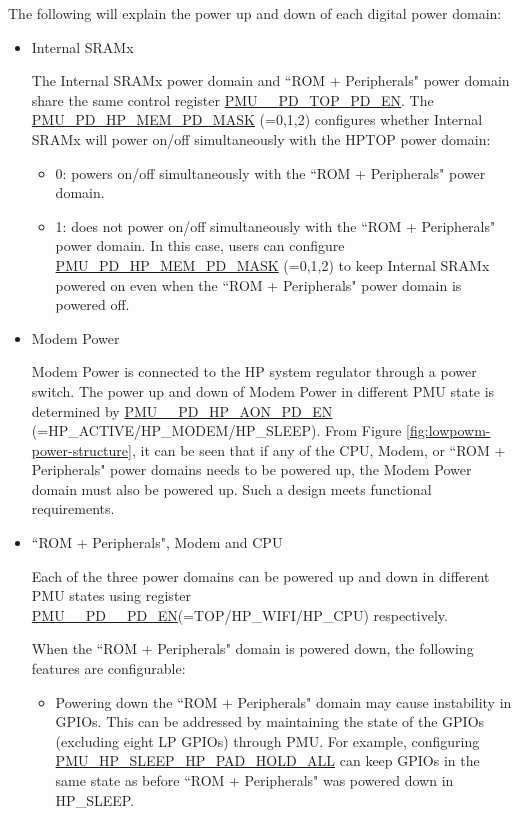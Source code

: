 \documentclass[main\_\_EN.tex]{subfiles}
\begin{document}
The following will explain the power up and down of each digital power domain:

\begin{itemize}
    \item Internal SRAMx

    The Internal SRAMx power domain and ``ROM + Peripherals" power domain share the same control register \hyperref[fielddesc:PMUHPACTIVEPDTOPPDEN]{PMU\_\_PD\_TOP\_PD\_EN}. The \hyperref[fielddesc:PMUPDHPMEM0PDMASK]{PMU\_PD\_HP\_MEM\_PD\_MASK} (=0,1,2) configures whether Internal SRAMx will power on/off simultaneously with the HPTOP power domain:

    \begin{itemize}
        \item 0: powers on/off simultaneously with the ``ROM + Peripherals" power domain.
        \item 1: does not power on/off simultaneously with the ``ROM + Peripherals" power domain. In this case, users can configure \hyperref[fielddesc:PMUPDHPMEM0PDMASK]{PMU\_PD\_HP\_MEM\_PD\_MASK} (=0,1,2) to keep Internal SRAMx powered on even when the ``ROM + Peripherals" power domain is powered off.
    \end{itemize}

    \item Modem Power

    Modem Power is connected to the HP system regulator through a power switch. The power up and down of Modem Power in different PMU state is determined by \hyperref[fielddesc:PMUHPACTIVEPDHPAONPDEN]{PMU\_\_PD\_HP\_AON\_PD\_EN} (=HP\_ACTIVE/HP\_MODEM/HP\_SLEEP). From Figure \ref{fig:lowpowm-power-structure}, it can be seen that if any of the CPU, Modem, or ``ROM + Peripherals" power domains needs to be powered up, the Modem Power domain must also be powered up. Such a design meets functional requirements.

    \item ``ROM + Peripherals", Modem and CPU

    Each of the three power domains can be powered up and down in different PMU states using register \hyperref[fielddesc:PMUHPACTIVEPDHPCPUPDEN]{PMU\_\_PD\_\_PD\_EN}(=TOP/HP\_WIFI/HP\_CPU) respectively.

    When the ``ROM + Peripherals" domain is powered down, the following features are configurable:
        \begin{itemize}
        \item Powering down the ``ROM + Peripherals" domain may cause instability in GPIOs. This can be addressed by maintaining the state of the GPIOs (excluding eight LP GPIOs) through PMU. For example, configuring \hyperref[fielddesc:PMUHPSLEEPHPPADHOLDALL]{PMU\_HP\_SLEEP\_HP\_PAD\_HOLD\_ALL} can keep GPIOs in the same state as before ``ROM + Peripherals" was powered down in HP\_SLEEP.


\end{itemize}
\end{itemize}
\end{document}
